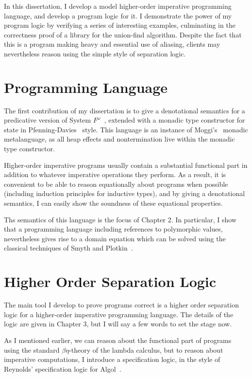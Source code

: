 In this dissertation, I develop a model higher-order imperative
programming language, and develop a program logic for it. I
demonstrate the power of my program logic by verifying a series of
interesting examples, culminating in the correctness proof of a
library for the union-find algorithm. Despite the fact that this is a
program making heavy and essential use of aliasing, clients may
nevertheless reason using the simple style of separation logic.

\section{Programming Language}

The first contribution of my dissertation is to give a denotational
semantics for a predicative version of System
$F^\omega$~\cite{girard-thesis}, extended with a monadic type
constructor for state in Pfenning-Davies~\cite{pfenning-davies}
style. This language is an instance of Moggi's~\cite{moggi-monads}
monadic metalanguage, as all heap effects and nontermination live
within the monadic type constructor.

Higher-order imperative programs usually contain a substantial
functional part in addition to whatever imperative operations they
perform. As a result, it is convenient to be able to reason
equationally about programs when possible (including induction
principles for inductive types), and by giving a denotational
semantics, I can easily show the soundness of these equational
properties.

Ths semantics of this language is the focus of Chapter 2. In
particular, I show that a programming language including references to
polymorphic values, nevertheless gives rise to a domain equation which
can be solved using the classical techniques of Smyth and
Plotkin~\cite{smyth-plotkin}.

\section{Higher Order Separation Logic}

The main tool I develop to prove programs correct is a higher order
separation logic for a higher-order imperative programming
language. The details of the logic are given in Chapter 3, but 
I will say a few words to set the stage now. 

As I mentioned earlier, we can reason about the functional part of
programs using the standard $\beta\eta$-theory of the lambda calculus,
but to reason about imperative computations, I introduce a
specification logic, in the style of Reynolds' specification logic for
Algol~\citep{spec-logic}.

